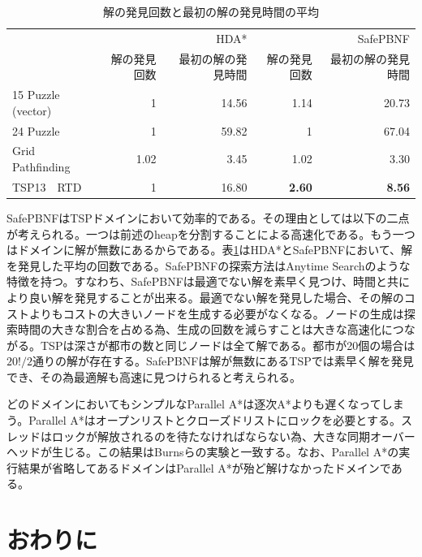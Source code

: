 \documentclass[uplatex]{jsarticle}
\begin{document}
\begin{table}
	\centering
	\begin{tabular}{lrrrr} \hline
		 & &             HDA* & & SafePBNF \\ 
		 &  解の発見回数 & 最初の解の発見時間 & 解の発見回数 & 最初の解の発見時間 \\ \hline
		15 Puzzle (vector)& 1 & 14.56 & 1.14 & 20.73 \\ 
		24 Puzzle & 1 & 59.82 & 1 & 67.04 \\ 
		Grid Pathfinding & 1.02 & 3.45 & 1.02 & 3.30 \\ 
		TSP13　RTD & 1 & 16.80 & \textbf{2.60} & \textbf{8.56} \\ \hline
	\end{tabular}
	\caption{解の発見回数と最初の解の発見時間の平均}
	\label{hdastar_incumbent}
\end{table}


SafePBNFはTSPドメインにおいて効率的である。その理由としては以下の二点が考えられる。一つは前述のheapを分割することによる高速化である。もう一つはドメインに解が無数にあるからである。表\ref{hdastar_incumbent}はHDA*とSafePBNFにおいて、解を発見した平均の回数である。SafePBNFの探索方法はAnytime Searchのような特徴を持つ\cite{Burns2010}。すなわち、SafePBNFは最適でない解を素早く見つけ、時間と共により良い解を発見することが出来る。最適でない解を発見した場合、その解のコストよりもコストの大きいノードを生成する必要がなくなる。ノードの生成は探索時間の大きな割合を占める為、生成の回数を減らすことは大きな高速化につながる。TSPは深さが都市の数と同じノードは全て解である。都市が20個の場合は$20!/2$通りの解が存在する。SafePBNFは解が無数にあるTSPでは素早く解を発見でき、その為最適解も高速に見つけられると考えられる。
\newline

どのドメインにおいてもシンプルなParallel A*は逐次A*よりも遅くなってしまう。Parallel A*はオープンリストとクローズドリストにロックを必要とする。スレッドはロックが解放されるのを待たなければならない為、大きな同期オーバーヘッドが生じる。この結果はBurnsらの実験と一致する\cite{Burns2010}。なお、Parallel A*の実行結果が省略してあるドメインはParallel A*が殆ど解けなかったドメインである。
\newline

\section{おわりに}
\label{sec:conclusion}
\end{document}
